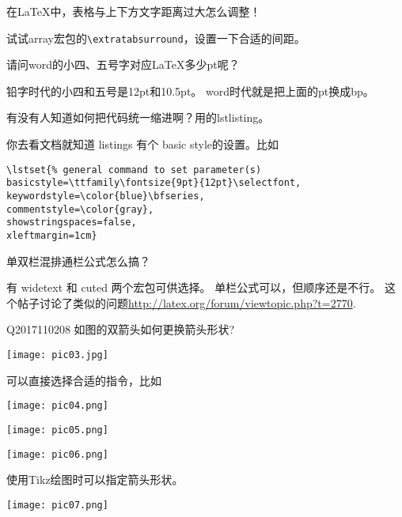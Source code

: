 \documentclass[QA.tex]{subfiles}
\begin{document}
\begin{qst}\label{Q2017110204}
在\LaTeX{}中，表格与上下方文字距离过大怎么调整！
\end{qst}
\ans 试试array宏包的\verb|\extratabsurround|，设置一下合适的间距。

\begin{qst}\label{Q2017110205}
请问word的小四、五号字对应LaTeX多少pt呢？
\end{qst}
\ans 铅字时代的小四和五号是12pt和10.5pt。
word时代就是把上面的pt换成bp。

\begin{qst}\label{Q2017110206}
有没有人知道如何把代码统一缩进啊？用的lstlisting。
\end{qst}
\ans 你去看文档就知道 listings 有个 basic style的设置。比如
\begin{verbatim}
\lstset{% general command to set parameter(s)
basicstyle=\ttfamily\fontsize{9pt}{12pt}\selectfont,
keywordstyle=\color{blue}\bfseries,
commentstyle=\color{gray},
showstringspaces=false,
xleftmargin=1cm}
\end{verbatim}

\begin{qst}\label{Q2017110207}
单双栏混排通栏公式怎么搞？
\end{qst}
\ans 有 widetext 和 cuted 两个宏包可供选择。
单栏公式可以，但顺序还是不行。
这个帖子讨论了类似的问题\url{http://latex.org/forum/viewtopic.php?t=2770}.

\begin{qst}{Q2017110208}
如图的双箭头如何更换箭头形状?

\texttt{[image: pic03.jpg]}
\end{qst}
\ans 可以直接选择合适的指令，比如

\texttt{[image: pic04.png]}

\texttt{[image: pic05.png]}

\texttt{[image: pic06.png]}

使用Tikz绘图时可以指定箭头形状。

\texttt{[image: pic07.png]}
\end{document}
